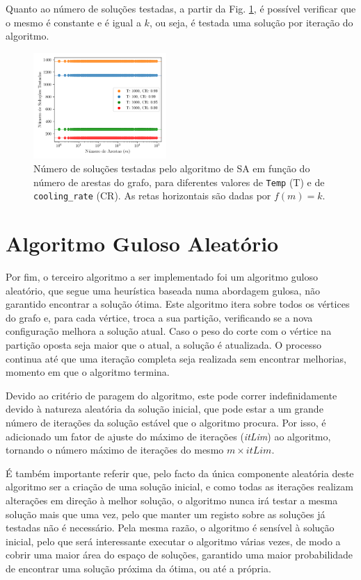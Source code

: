 \documentclass[mirror, portugues]{revdetua}
\begin{document}
Quanto ao número de soluções testadas, a partir da Fig. \ref{fig:sols_satested}, é possível verificar que o mesmo é constante e é igual a $k$, ou seja, é testada uma solução por iteração do algoritmo.

\begin{figure}[H]
    \centering
    \includegraphics[width=0.45\textwidth]{../assets/sols_Simulated .png}
    \caption{Número de soluções testadas pelo algoritmo de SA em função do número de arestas do grafo, para diferentes valores de \texttt{Temp} (T) e de \texttt{cooling\_rate} (CR). As retas horizontais são dadas por $f(m) = k$.}
    \label{fig:sols_satested}
\end{figure}

\section{Algoritmo Guloso Aleatório}

Por fim, o terceiro algoritmo a ser implementado foi um algoritmo guloso aleatório, que segue uma heurística baseada numa abordagem gulosa, não garantido encontrar a solução ótima. Este algoritmo itera sobre todos os vértices do grafo e, para cada vértice, troca a sua partição, verificando se a nova configuração melhora a solução atual. Caso o peso do corte com o vértice na partição oposta seja maior que o atual, a solução é atualizada. O processo continua até que uma iteração completa seja realizada sem encontrar melhorias, momento em que o algoritmo termina.

Devido ao critério de paragem do algoritmo, este pode correr indefinidamente devido à natureza aleatória da solução inicial, que pode estar a um grande número de iterações da solução estável que o algoritmo procura. Por isso, é adicionado um fator de ajuste do máximo de iterações (\textit{itLim}) ao algoritmo, tornando o número máximo de iterações do mesmo $m \times itLim$.

É também importante referir que, pelo facto da única componente aleatória deste algoritmo ser a criação de uma solução inicial, e como todas as iterações realizam alterações em direção à melhor solução, o algoritmo nunca irá testar a mesma solução mais que uma vez, pelo que manter um registo sobre as soluções já testadas não é necessário. Pela mesma razão, o algoritmo é sensível à solução inicial, pelo que será interessante executar o algoritmo várias vezes, de modo a cobrir uma maior área do espaço de soluções, garantido uma maior probabilidade de encontrar uma solução próxima da ótima, ou até a própria.
\end{document}
